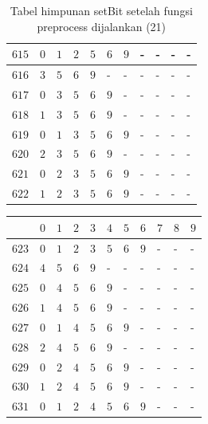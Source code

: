 \begin{appendices}
\begin{table}[H]
\begin{tabular} {|l|l|l|l|l|l|l|l|l|l|l|}
  		$ 615 $ & $ 0 $ &$ 1 $ &$ 2 $ &$ 5 $ &$ 6 $ &$ 9 $ & - &  - &  - &  -   \\ \hline
  		$ 616 $ & $ 3 $ &$ 5 $ &$ 6 $ &$ 9 $ & - &  - &  - &  - &  - &  -   \\ \hline
  		$ 617 $ & $ 0 $ &$ 3 $ &$ 5 $ &$ 6 $ &$ 9 $ & - &  - &  - &  - &  -   \\ \hline
  		$ 618 $ & $ 1 $ &$ 3 $ &$ 5 $ &$ 6 $ &$ 9 $ & - &  - &  - &  - &  -   \\ \hline
  		$ 619 $ & $ 0 $ &$ 1 $ &$ 3 $ &$ 5 $ &$ 6 $ &$ 9 $ & - &  - &  - &  -   \\ \hline
  		$ 620 $ & $ 2 $ &$ 3 $ &$ 5 $ &$ 6 $ &$ 9 $ & - &  - &  - &  - &  -   \\ \hline
  		$ 621 $ & $ 0 $ &$ 2 $ &$ 3 $ &$ 5 $ &$ 6 $ &$ 9 $ & - &  - &  - &  -   \\ \hline
  		$ 622 $ & $ 1 $ &$ 2 $ &$ 3 $ &$ 5 $ &$ 6 $ &$ 9 $ & - &  - &  - &  -   \\ \hline
  	\end{tabular}\caption{Tabel himpunan setBit setelah fungsi preprocess dijalankan (21)}
  	\label{tab:setbit_21}
  \end{table}
  \begin{table}[H]
  	\centering
  	\begin{tabular} {|l|l|l|l|l|l|l|l|l|l|l|} \hline
  		\backslashbox{$Num$}{$index$} & $ 0 $ & $ 1 $ & $ 2 $ & $ 3 $ & $ 4 $ & $ 5 $ & $ 6 $ & $ 7 $ & $ 8 $ & $ 9 $ \\ \hline
  		$ 623 $ & $ 0 $ &$ 1 $ &$ 2 $ &$ 3 $ &$ 5 $ &$ 6 $ &$ 9 $ & - &  - &  -   \\ \hline
  		$ 624 $ & $ 4 $ &$ 5 $ &$ 6 $ &$ 9 $ & - &  - &  - &  - &  - &  -   \\ \hline
  		$ 625 $ & $ 0 $ &$ 4 $ &$ 5 $ &$ 6 $ &$ 9 $ & - &  - &  - &  - &  -   \\ \hline
  		$ 626 $ & $ 1 $ &$ 4 $ &$ 5 $ &$ 6 $ &$ 9 $ & - &  - &  - &  - &  -   \\ \hline
  		$ 627 $ & $ 0 $ &$ 1 $ &$ 4 $ &$ 5 $ &$ 6 $ &$ 9 $ & - &  - &  - &  -   \\ \hline
  		$ 628 $ & $ 2 $ &$ 4 $ &$ 5 $ &$ 6 $ &$ 9 $ & - &  - &  - &  - &  -   \\ \hline
  		$ 629 $ & $ 0 $ &$ 2 $ &$ 4 $ &$ 5 $ &$ 6 $ &$ 9 $ & - &  - &  - &  -   \\ \hline
  		$ 630 $ & $ 1 $ &$ 2 $ &$ 4 $ &$ 5 $ &$ 6 $ &$ 9 $ & - &  - &  - &  -   \\ \hline
  		$ 631 $ & $ 0 $ &$ 1 $ &$ 2 $ &$ 4 $ &$ 5 $ &$ 6 $ &$ 9 $ & - &  - &  -   \\ \hline

\end{tabular}
\end{table}
\end{appendices}
